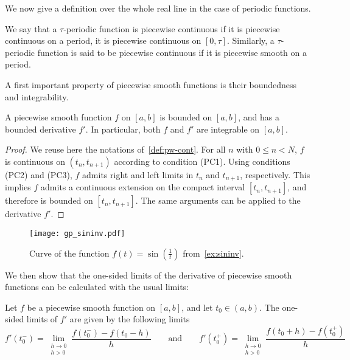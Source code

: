 We now give a definition over the whole real line in the case of periodic functions.
\begin{definition}
  We say that a $\tau$-periodic function is piecewise continuous if it is piecewise
  continuous on a period, \eg it is piecewise continuous on $[0,\tau]$. Similarly, a
  $\tau$-periodic function is said to be piecewise continuous if it is piecewise smooth on
  a period.
\end{definition}
A first important property of piecewise smooth functions is their boundedness and
integrability.
\begin{proposition}
  A piecewise smooth function $f$ on $[a,b]$ is bounded on $[a,b]$, and has a bounded
  derivative $f'$. In particular, both $f$ and $f'$ are integrable on $[a,b]$.
\end{proposition}
\begin{proof}
  We reuse here the notations of~\cref{def:pw-cont}. For all $n$ with $0\leq n< N$, $f$ is
  continuous on $(t_n,t_{n+1})$ according to condition (PC1). Using conditions (PC2) and
  (PC3), $f$ admits right and left limits in $t_n$ and $t_{n+1}$, respectively. This
  implies $f$ admits a continuous extension on the compact interval $[t_n,t_{n+1}]$, and
  therefore is bounded on $[t_n,t_{n+1}]$. The same arguments can be applied to the
  derivative $f'$.
\end{proof}
\begin{figure}[t]
  \centering
  \texttt{[image: gp\_sininv.pdf]}
  \caption{Curve of the function $f(t)=\sin(\frac{1}{t})$ from~\cref{ex:sininv}.}
  \label{fig:sininv}
\end{figure}
We then show that the one-sided limits of the derivative of piecewise smooth functions can
be calculated with the usual limits:
\begin{proposition}
  \label{prop:oneside-der}
  Let $f$ be a piecewise smooth function on $[a,b]$, and let $t_0\in(a,b)$. The one-sided
  limits of $f'$ are given by the following limits
  \begin{equation}
    f'(t_0^-)=\lim_{\substack{h\to0\\h>0}}\frac{f(t_0^-)-f(t_0-h)}{h}
    \qquad\text{and}\qquad
    f'(t_0^+)=\lim_{\substack{h\to0\\h>0}}\frac{f(t_0+h)-f(t_0^+)}{h}
  \end{equation}
\end{proposition}
